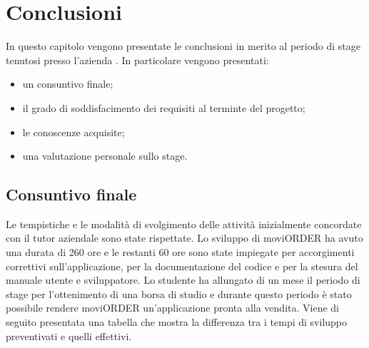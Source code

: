 
\chapter{Conclusioni}
\label{cap:conclusioni}
In questo capitolo vengono presentate le conclusioni in merito al periodo di stage tenutosi presso l'azienda \visione{}. In particolare vengono presentati:
\begin{itemize}
	\item un consuntivo finale;
	\item il grado di soddisfacimento dei requisiti al terminte del progetto;
	\item le conoscenze acquisite;
	\item una valutazione personale sullo stage.
\end{itemize}
\section{Consuntivo finale}

Le tempistiche e le modalità di svolgimento delle attività inizialmente concordate con il tutor aziendale sono state rispettate. Lo sviluppo di moviORDER ha avuto una durata di 260 ore e le restanti 60 ore sono state impiegate per accorgimenti correttivi sull'applicazione, per la documentazione del codice e per la stesura del manuale utente e sviluppatore. Lo studente ha allungato di un mese il periodo di stage per l'ottenimento di una borsa di studio e durante questo periodo è stato possibile rendere moviORDER un'applicazione pronta alla vendita. Viene di seguito presentata una tabella che mostra la differenza tra i tempi di sviluppo preventivati e quelli effettivi.

